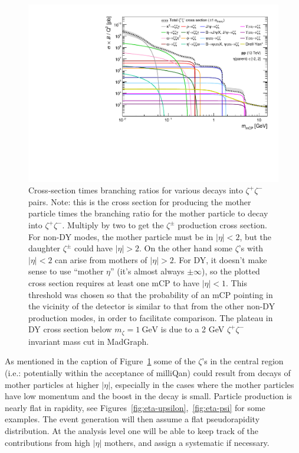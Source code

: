 \documentclass[12pt]{article}
\begin{document}
\begin{figure}
  \begin{center}
  \includegraphics[width=0.8\linewidth]{../scripts/plot-xsecs/mcp-xsec.pdf}
  \caption{\protect Cross-section times branching ratios for various
    decays into $\zeta^+ \zeta^-$ pairs.  Note: this is
    the cross section for producing the mother particle times the
    branching ratio for the mother particle to decay into $\zeta^+ \zeta^-$.
    Multiply by two to get the $\zeta^{\pm}$ production cross section.
    For non-DY modes, the mother particle must be in $|\eta|<2$, but the
    daughter $\zeta^{\pm}$ could have $|\eta|>2$.  On the other hand some
    $\zeta$'s with $|\eta|<2$ can arise from mothers of $|\eta|>2$. For DY,
    it doesn't make sense to use ``mother $\eta$'' (it's almost always $\pm\infty$), 
    so the plotted cross section requires at least one mCP to have $|\eta|<1$. 
    This threshold was chosen so that the probability of an mCP pointing in the vicinity of 
    the detector is similar to that from the other non-DY production modes, 
    in order to facilitate comparison. The plateau in DY cross section below 
    $m_\zeta=1~\text{GeV}$ is due to a 2 GeV $\zeta^+\zeta^-$ invariant mass cut in MadGraph.}
\label{fig:total-rates}
\end{center}
  \end{figure}



As mentioned in the caption of Figure~\ref{fig:total-rates} some
of the $\zeta$'s in the central region (i.e.: potentially within
the acceptance of milliQan) could result from decays of mother
particles at higher $|\eta|$, especially in the cases where
the mother particles have low momentum and the boost in the
decay is small.
Particle production is
nearly flat in rapidity, see
Figures~\ref{fig:eta-upsilon},~\ref{fig:eta-psi}
for some examples.
The event generation will then
assume a flat pseudorapidity distribution.
At the analysis level one will be able to keep track of the
contributions from high $|\eta|$ mothers, and assign a systematic
if necessary.
\end{document}
